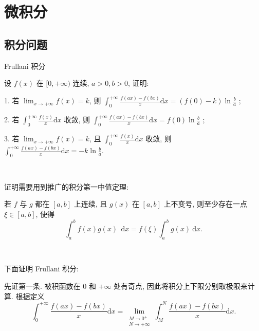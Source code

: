 \chapter{微积分}

\section{积分问题}

\noindent Frullani 积分

设 $f(x)$ 在 $[0,+\infty)$ 连续, $a>0, b>0$, 证明:

1. 若 $\displaystyle \lim_{x \to +\infty} f(x) = k$, 则 $\displaystyle \int_0^{+\infty}\frac{f(ax)-f(bx)}{x}\mathrm{d}x = \left(f(0) - k\right)\ln\frac{b}{a}$ ;

2. 若 $\displaystyle \int_0^{+\infty}\frac{f(x)}{x}\mathrm{d}x$ 收敛, 则 $\displaystyle \int_0^{+\infty}\frac{f(ax)-f(bx)}{x}\mathrm{d}x = f(0)\ln\frac{b}{a}$ ;

3. 若 $\displaystyle \lim_{x \to +\infty} f(x) = k$, 且 $\displaystyle \int_0^{+\infty}\frac{f(x)}{x}\mathrm{d}x$ 收敛, 则 $\displaystyle \int_0^{+\infty}\frac{f(ax)-f(bx)}{x}\mathrm{d}x = -k\ln\frac{b}{a}$.

~

\noindent 证明需要用到推广的积分第一中值定理:

若 $f$ 与 $g$ 都在 $[a,b]$ 上连续, 且 $g(x)$ 在 $[a,b]$ 上不变号, 则至少存在一点 $\xi\in[a,b]$, 使得
\[\int_a^b f(x)g(x)\ \ \mathrm{d}x = f(\xi)\int_a^b g(x)\ \mathrm{d}x .\]

~

\noindent 下面证明 Frullani 积分: 

先证第一条. 被积函数在 $0$ 和 $+\infty$ 处有奇点, 因此将积分上下限分别取极限来计算. 根据定义
\[\int_0^{+\infty}\frac{f(ax)-f(bx)}{x}\mathrm{d}x = \lim_{\substack{M\to 0^+ \\ N\to +\infty}}\int_M^N\frac{f(ax)-f(bx)}{x}\mathrm{d}x .\]


